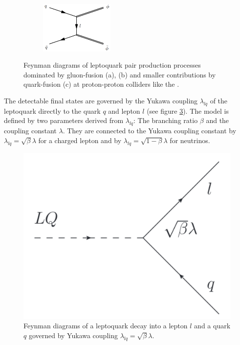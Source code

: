 \begin{figure}
\begin{subfigure}[t]{0.9\textwidth}
                \includegraphics[width=0.4\textwidth]{figures/qff.pdf}
                \label{qfc}
                \end{subfigure}
%
\caption[Feynman diagrams of leptoquark pair production processes at proton-proton colliders like the {\LHC}.]{Feynman diagrams of leptoquark pair production processes dominated by gluon-fusion (a), (b) and smaller contributions by quark-fusion (c) at proton-proton colliders like the {\LHC}. \cite{hunter}}
\label{LQpairs}
\end{figure}
%
%
%
%
%
The detectable final states are governed by the Yukawa coupling $\lambda_{lq}$ of the leptoquark directly to the quark $q$ and lepton $l$ (see figure \ref{YukawaLQ}). The model is defined by two parameters derived from $\lambda_{lq}$: The branching ratio $\beta$ and the coupling constant $\lambda$. They are connected to the Yukawa coupling constant by $\lambda_{lq}=\sqrt{\beta}\lambda$ for a charged lepton and by $\lambda_{lq}=\sqrt{1-\beta}\lambda$ for neutrinos. \cite{currentStatus:13TeVATLAS}\par
%
\begin{figure}[htbp]                                 
 \begin{center}                                       
  \includegraphics[width=0.4\linewidth]{figures/yukawa.pdf} 
   \caption[Feynman diagram of a leptoquark decay governed by Yukawa coupling.]{Feynman diagrams of a leptoquark decay into a lepton $l$ and a quark $q$ governed by Yukawa coupling $\lambda_{lq}=\sqrt{\beta}\lambda$. \cite{currentStatus:13TeVATLAS}}
  \label{YukawaLQ}                                     
 \end{center}
\end{figure}

